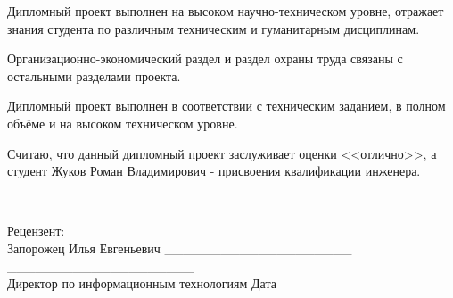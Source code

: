 \documentclass
[a4paper,14pt,russian]{article}
\begin{document}
         Дипломный проект выполнен на высоком научно-техническом уровне, отражает знания студента по различным техническим и гуманитарным дисциплинам.
         
         Организационно-экономический раздел и раздел охраны труда связаны с остальными разделами проекта.
         
          Дипломный проект выполнен в соответствии с техническим заданием, в полном объёме и на высоком техническом уровне.
          
          Считаю, что данный дипломный проект заслуживает оценки <<отлично>>, а студент Жуков Роман Владимирович - присвоения квалификации инженера.
 
 ~
 
          
Рецензент: \hfill \\ 
Запорожец Илья Евгеньевич \hfill \_\_\_\_\_\_\_\_\_\_\_\_\_\_\_\_\_\_\_\_ ~ ~ ~
\_\_\_\_\_\_\_\_\_\_\_\_\_\_\_\_\_\_\_\_ \\
Директор по информационным технологиям \hfill Дата
\end{document}

